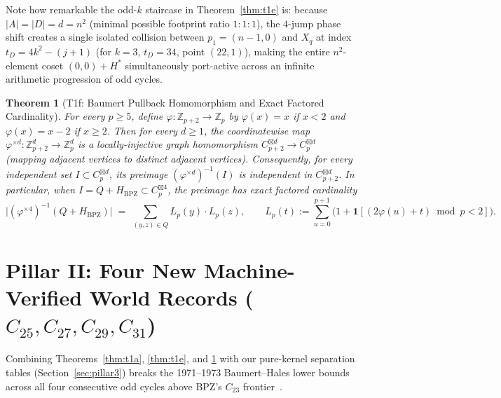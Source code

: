 \documentclass[11pt,reqno]{amsart}
\newtheorem{theorem}{Theorem}[section]
\theoremstyle{definition}
\newcommand{\Z}{\mathbb{Z}}
\newcommand{\sprod}{\boxtimes}
\newcommand{\Hbpz}{H_{\mathrm{BPZ}}}
\newcommand{\Hstar}{H^*}
\begin{document}
Note how remarkable the odd-$k$ staircase in Theorem~\ref{thm:t1e} is: because $|A|=|D|=d=n^2$ (minimal possible footprint ratio $1{:}1{:}1$), the $4$-jump phase shift creates a single isolated collision between $p_1 = (n-1,0)$ and $X_q$ at index $t_D = 4k^2 - (j+1)$ (for $k=3$, $t_D = 34$, point $(22,1)$), making the entire $n^2$-element coset $(0,0)+\Hstar$ simultaneously port-active across an infinite arithmetic progression of odd cycles.

\begin{theorem}[T1f: Baumert Pullback Homomorphism and Exact Factored Cardinality]\label{thm:t1f}
For every $p \ge 5$, define $\varphi : \Z_{p+2} \to \Z_p$ by $\varphi(x) = x$ if $x < 2$ and $\varphi(x) = x - 2$ if $x \ge 2$. Then for every $d \ge 1$, the coordinatewise map $\varphi^{\times d} : \Z_{p+2}^d \to \Z_p^d$ is a locally-injective graph homomorphism $C_{p+2}^{\sprod d} \to C_p^{\sprod d}$ (mapping adjacent vertices to distinct adjacent vertices). Consequently, for every independent set $I \subset C_p^{\sprod d}$, its preimage $(\varphi^{\times d})^{-1}(I)$ is independent in $C_{p+2}^{\sprod d}$. In particular, when $I = Q + \Hbpz \subset C_p^{\sprod 4}$, the preimage has exact factored cardinality
\[
  \bigl|(\varphi^{\times 4})^{-1}(Q + \Hbpz)\bigr| \;=\; \sum_{(y,z)\in Q} L_p(y) \cdot L_p(z),
  \qquad L_p(t) := \sum_{u=0}^{p+1} \bigl(1 + \mathbf{1}[(2\varphi(u)+t)\bmod p < 2]\bigr).
\]
\end{theorem}

\section{Pillar II: Four New Machine-Verified World Records (\texorpdfstring{$C_{25}, C_{27}, C_{29}, C_{31}$}{C25, C27, C29, C31})}\label{sec:pillar2}

Combining Theorems~\ref{thm:t1a}, \ref{thm:t1e}, and \ref{thm:t1f} with our pure-kernel separation tables (Section~\ref{sec:pillar3}) breaks the 1971--1973 Baumert--Hales lower bounds~\cite{baumert1971combinatorial,hales1973numerical} across all four consecutive odd cycles above BPZ's $C_{23}$ frontier~\cite{bpz2026lean}.
\end{document}
